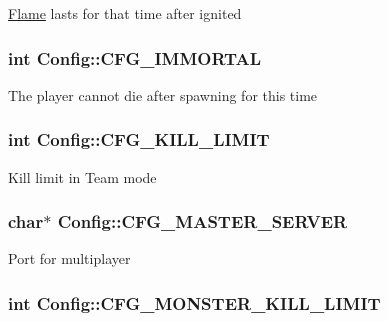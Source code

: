 \hyperlink{class_flame}{Flame} lasts for that time after ignited \hypertarget{class_config_aba9d64248625f53dee1028d3e4bf687d}{
\subsubsection[{C\-F\-G\-\_\-\-I\-M\-M\-O\-R\-T\-A\-L}]{\setlength{\rightskip}{0pt plus 5cm}int Config\-::\-C\-F\-G\-\_\-\-I\-M\-M\-O\-R\-T\-A\-L}}\label{class_config_aba9d64248625f53dee1028d3e4bf687d}
The player cannot die after spawning for this time \hypertarget{class_config_aaf0bde712e3c56f189007cadbf917926}{
\subsubsection[{C\-F\-G\-\_\-\-K\-I\-L\-L\-\_\-\-L\-I\-M\-I\-T}]{\setlength{\rightskip}{0pt plus 5cm}int Config\-::\-C\-F\-G\-\_\-\-K\-I\-L\-L\-\_\-\-L\-I\-M\-I\-T}}\label{class_config_aaf0bde712e3c56f189007cadbf917926}
Kill limit in Team mode \hypertarget{class_config_aefdce4f53a398a3811941781489b038e}{
\subsubsection[{C\-F\-G\-\_\-\-M\-A\-S\-T\-E\-R\-\_\-\-S\-E\-R\-V\-E\-R}]{\setlength{\rightskip}{0pt plus 5cm}char$\ast$ Config\-::\-C\-F\-G\-\_\-\-M\-A\-S\-T\-E\-R\-\_\-\-S\-E\-R\-V\-E\-R}}\label{class_config_aefdce4f53a398a3811941781489b038e}
Port for multiplayer \hypertarget{class_config_af25bcab4e4abdd6e206bceaa0d773474}{
\subsubsection[{C\-F\-G\-\_\-\-M\-O\-N\-S\-T\-E\-R\-\_\-\-K\-I\-L\-L\-\_\-\-L\-I\-M\-I\-T}]{\setlength{\rightskip}{0pt plus 5cm}int Config\-::\-C\-F\-G\-\_\-\-M\-O\-N\-S\-T\-E\-R\-\_\-\-K\-I\-L\-L\-\_\-\-L\-I\-M\-I\-T}}\label{class_config_af25bcab4e4abdd6e206bceaa0d773474}
